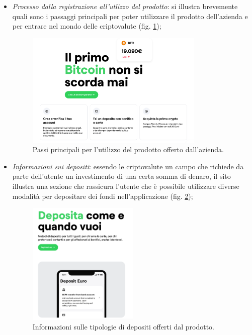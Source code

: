 \begin{itemize}
  \item \textit{Processo dalla registrazione all'utlizzo del prodotto}: 
  si illustra brevemente quali sono i passaggi principali per poter 
  utilizzare il prodotto dell'azienda e per entrare nel mondo delle 
  criptovalute (fig. \ref{fig:registration-process});
  \begin{figure}[H]
    \centering
    \includegraphics[width=0.80\textwidth]{res/images/registration-process.png}
    \caption{Passi principali per l'utilizzo del prodotto offerto dall'azienda.}
    \label{fig:registration-process}
  \end{figure}

  \item \textit{Informazioni sui depositi}: essendo le criptovalute un 
  campo che richiede da parte dell'utente un investimento di una certa 
  somma di denaro, il sito illustra una sezione che rassicura l'utente 
  che è possibile utilizzare diverse modalità per depositare dei fondi 
  nell'applicazione (fig. \ref{fig:deposit-options});
  \begin{figure}[H]
    \centering
    \includegraphics[width=0.50\textwidth]{res/images/deposit-options.png}
    \caption{Informazioni sulle tipologie di depositi offerti dal prodotto.}
    \label{fig:deposit-options}
  \end{figure}


\end{itemize}
